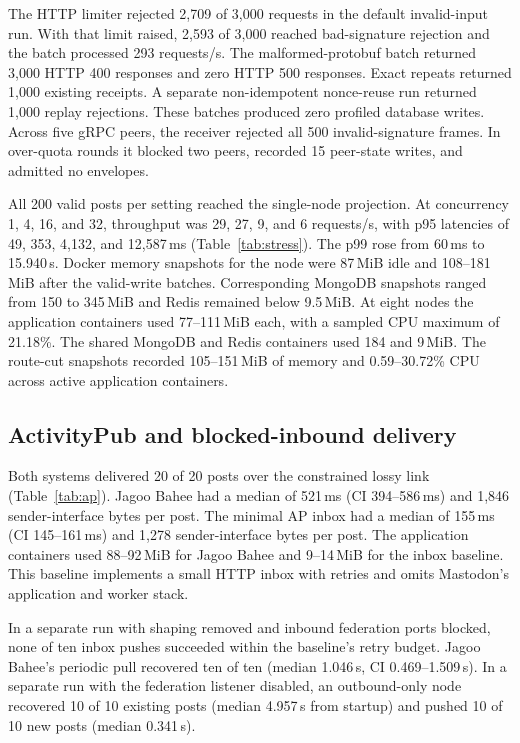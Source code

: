 \documentclass[conference,a4paper,10pt]{IEEEtran}
\begin{document}
The HTTP limiter rejected 2,709 of 3,000 requests in the default invalid-input run. With that limit raised, 2,593 of 3,000 reached bad-signature rejection and the batch processed 293 requests/s. The malformed-protobuf batch returned 3,000 HTTP 400 responses and zero HTTP 500 responses. Exact repeats returned 1,000 existing receipts. A separate non-idempotent nonce-reuse run returned 1,000 replay rejections. These batches produced zero profiled database writes. Across five gRPC peers, the receiver rejected all 500 invalid-signature frames. In over-quota rounds it blocked two peers, recorded 15 peer-state writes, and admitted no envelopes.

All 200 valid posts per setting reached the single-node projection. At concurrency 1, 4, 16, and 32, throughput was 29, 27, 9, and 6 requests/s, with p95 latencies of 49, 353, 4,132, and 12,587\,ms (Table~\ref{tab:stress}). The p99 rose from 60\,ms to 15.940\,s. Docker memory snapshots for the node were 87\,MiB idle and 108--181\,MiB after the valid-write batches. Corresponding MongoDB snapshots ranged from 150 to 345\,MiB and Redis remained below 9.5\,MiB. At eight nodes the application containers used 77--111\,MiB each, with a sampled CPU maximum of 21.18\%. The shared MongoDB and Redis containers used 184 and 9\,MiB. The route-cut snapshots recorded 105--151\,MiB of memory and 0.59--30.72\% CPU across active application containers.

\subsection{ActivityPub and blocked-inbound delivery}

Both systems delivered 20 of 20 posts over the constrained lossy link (Table~\ref{tab:ap}). Jagoo Bahee had a median of 521\,ms (CI 394--586\,ms) and 1,846 sender-interface bytes per post. The minimal AP inbox had a median of 155\,ms (CI 145--161\,ms) and 1,278 sender-interface bytes per post. The application containers used 88--92\,MiB for Jagoo Bahee and 9--14\,MiB for the inbox baseline. This baseline implements a small HTTP inbox with retries and omits Mastodon's application and worker stack.

In a separate run with shaping removed and inbound federation ports blocked, none of ten inbox pushes succeeded within the baseline's retry budget. Jagoo Bahee's periodic pull recovered ten of ten (median 1.046\,s, CI 0.469--1.509\,s). In a separate run with the federation listener disabled, an outbound-only node recovered 10 of 10 existing posts (median 4.957\,s from startup) and pushed 10 of 10 new posts (median 0.341\,s).
\end{document}
